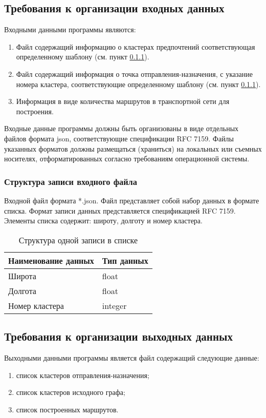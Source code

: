 \subsection{Требования к организации входных данных}\label{input-files}
Входными данными программы являются:
\begin{enumerate}
    \item Файл содержащий информацию о кластерах предпочтений соответствующая определенному шаблону (см. 
        пункт \ref{file-format}).
    \item Файл содержащий информация о точка отправления-назначения, с указание номера кластера, 
        соответствующие определенному шаблону (см. пункт \ref{file-format}). 
    \item Информация в виде количества маршрутов в транспортной сети для построения.
\end{enumerate}

Входные данные программы должны быть организованы в виде отдельных файлов формата json, соответствующие 
спецификации RFC 7159. Файлы указанных форматов должны размещаться (храниться) на локальных или съемных 
носителях, отформатированных согласно требованиям операционной системы.

\subsubsection{Структура записи входного файла}\label{file-format}
Входной файл формата *.json. Файл представляет собой набор данных в формате списка. Формат записи данных 
представляется спецификацией RFC 7159. Элементы списка содержит: широту, долготу и номер кластера.

\begin{table}[ht!]
    \centering
    \caption{Структура одной записи в списке}
    \label{table:clusters}
    \begin{tabular}{|l|l|}
        \hline
        Наименование данных & Тип данных \\ \hline
        Широта              & float      \\ \hline
        Долгота             & float      \\ \hline
        Номер кластера      & integer    \\ \hline
    \end{tabular}
\end{table}

\subsection{Требования к организации выходных данных}\label{output-files}
Выходными данными программы является файл содержащий следующие данные:
\begin{enumerate}
    \item список кластеров отправления-назначения;
    \item список кластеров исходного графа;
    \item список построенных маршрутов.
\end{enumerate}


